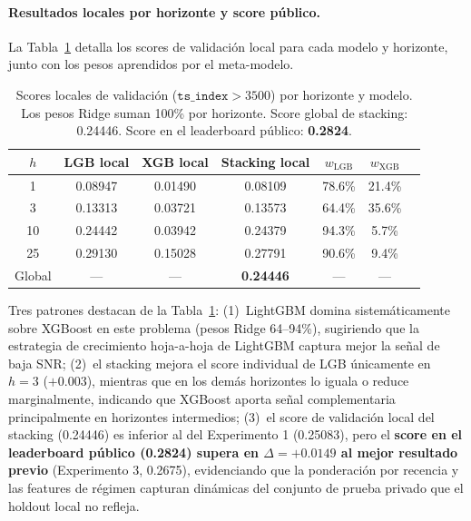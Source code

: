 \documentclass{article}
\begin{document}
\paragraph{Resultados locales por horizonte y score público.}
La Tabla~\ref{tab:stacking_scores} detalla los scores de validación local para cada modelo y horizonte, junto con los pesos aprendidos por el meta-modelo.

\begin{table}[h!]
  \caption{Scores locales de validación ($\texttt{ts\_index} > 3500$) por horizonte y modelo. Los pesos Ridge suman 100\% por horizonte. Score global de stacking: 0.24446. Score en el leaderboard público: \textbf{0.2824}.}
  \label{tab:stacking_scores}
  \centering
  \begin{tabular}{ccccccc}
    \toprule
    $h$ & LGB local & XGB local & Stacking local & $w_{\text{LGB}}$ & $w_{\text{XGB}}$ \\
    \midrule
    1  & 0.08947 & 0.01490 & 0.08109 & 78.6\% & 21.4\% \\
    3  & 0.13313 & 0.03721 & 0.13573 & 64.4\% & 35.6\% \\
    10 & 0.24442 & 0.03942 & 0.24379 & 94.3\% &  5.7\% \\
    25 & 0.29130 & 0.15028 & 0.27791 & 90.6\% &  9.4\% \\
    \midrule
    Global & --- & --- & \textbf{0.24446} & --- & --- \\
    \bottomrule
  \end{tabular}
\end{table}

Tres patrones destacan de la Tabla~\ref{tab:stacking_scores}: (1)~LightGBM domina sistemáticamente sobre XGBoost en este problema (pesos Ridge 64--94\%), sugiriendo que la estrategia de crecimiento hoja-a-hoja de LightGBM captura mejor la señal de baja SNR; (2)~el stacking mejora el score individual de LGB únicamente en $h=3$ ($+0.003$), mientras que en los demás horizontes lo iguala o reduce marginalmente, indicando que XGBoost aporta señal complementaria principalmente en horizontes intermedios; (3)~el score de validación local del stacking (0.24446) es inferior al del Experimento 1 (0.25083), pero el \textbf{score en el leaderboard público (0.2824) supera en $\Delta = +0.0149$ al mejor resultado previo} (Experimento 3, 0.2675), evidenciando que la ponderación por recencia y las features de régimen capturan dinámicas del conjunto de prueba privado que el holdout local no refleja.

\end{document}
